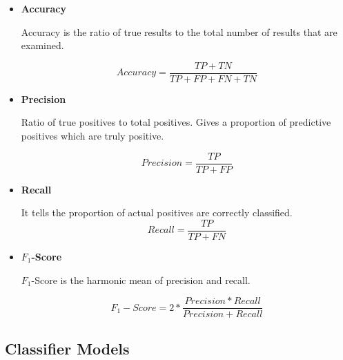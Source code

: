 \documentclass[12pt,letter-paper]{article}
\begin{document}
        \begin{itemize}
            \item\textbf{Accuracy}
            
                 Accuracy is the ratio of true results to the total number of results that are examined.
             
            \begin{equation}
                Accuracy = \frac{TP + TN }{TP + FP + FN + TN}
                \label{eq:3}
            \end{equation} 
                
            
            \item\textbf{Precision}
            
                Ratio of true positives to total positives. Gives a proportion of predictive positives which are truly positive.
            
            \begin{equation}
                Precision = \frac{TP}{TP + FP}
                \label{eq:4}
            \end{equation} 
            
            \item\textbf{Recall}
            
                It tells the proportion of actual positives are correctly classified.
            \begin{equation}
                Recall = \frac{TP}{TP + FN}
                \label{eq:5}
            \end{equation}
            
            \item\textbf{$F_1$-Score}
            
                $F_1$-Score is the harmonic mean of precision and recall.
            
            \begin{equation}
                F_1-Score = 2 * \frac{Precision * Recall}{Precision + Recall}
                \label{eq:6}
            \end{equation}
            
        \end{itemize}
        
    \subsection{Classifier Models}
    
\end{document}
